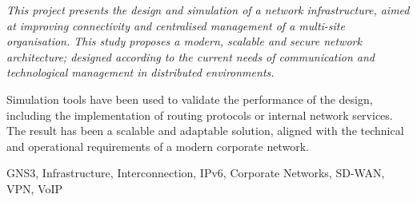 
\begin{summary}
{\em
\noindent
This project presents the design and simulation of a network infrastructure, aimed at improving 
connectivity and centralised management of a multi-site organisation. This study proposes a modern, 
scalable and secure network architecture; designed according to the current needs 
of communication and technological management in distributed environments.

\vspace{0.5cm}
\noindent
Simulation tools have been used to validate the performance of the design, including the implementation
of routing protocols or internal network services. The result has been a scalable and adaptable 
solution, aligned with the technical and operational requirements of a modern corporate network.
}

\em
\begin {keywords}
GNS3, Infrastructure, Interconnection, IPv6, Corporate Networks, SD-WAN, VPN, VoIP
\end {keywords}

\end{summary}